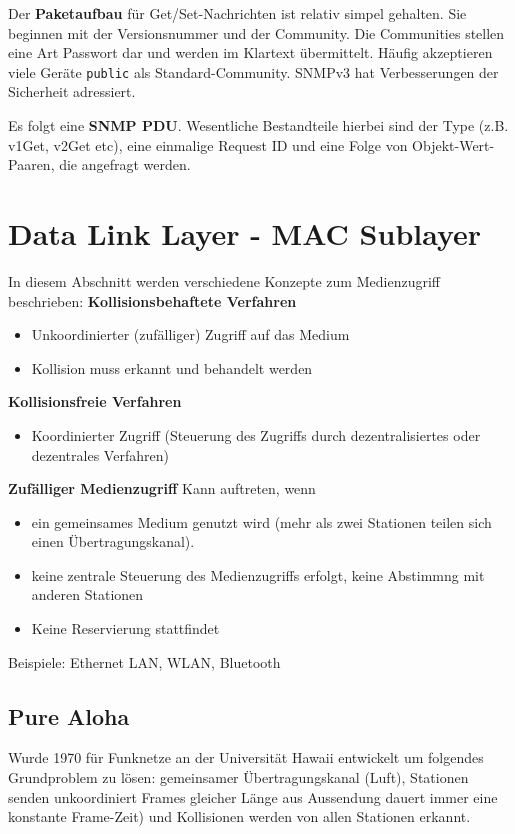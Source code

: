 \documentclass{article} %
\begin{document}
Der \textbf{Paketaufbau} für Get/Set-Nachrichten ist relativ simpel gehalten.
Sie beginnen mit der Versionsnummer und der Community.
Die Communities stellen eine Art Passwort dar und werden im Klartext übermittelt.
Häufig akzeptieren viele Geräte \texttt{public} als Standard-Community.
SNMPv3 hat Verbesserungen der Sicherheit adressiert.

Es folgt eine \textbf{SNMP PDU}.
Wesentliche Bestandteile hierbei sind der Type (z.B. v1Get, v2Get etc), eine einmalige Request ID und eine Folge von Objekt-Wert-Paaren, die angefragt werden.
\section{Data Link Layer - MAC Sublayer}
In diesem Abschnitt werden verschiedene Konzepte zum Medienzugriff beschrieben:
\textbf{Kollisionsbehaftete Verfahren}
	\begin{itemize}
	\item Unkoordinierter (zufälliger) Zugriff auf das Medium 
	\item Kollision muss erkannt und behandelt werden		
	\end{itemize} 
\textbf{Kollisionsfreie Verfahren}
	\begin{itemize}
	\item Koordinierter Zugriff (Steuerung des Zugriffs durch dezentralisiertes oder dezentrales Verfahren) 
	\end{itemize}
	
\textbf{Zufälliger Medienzugriff}
Kann auftreten, wenn 
	\begin{itemize}
	\item ein gemeinsames Medium genutzt wird (mehr als zwei Stationen teilen sich einen Übertragungskanal). 
	\item keine zentrale Steuerung des Medienzugriffs erfolgt, keine Abstimmng mit anderen Stationen 
	\item Keine Reservierung stattfindet
\end{itemize}
Beispiele: Ethernet LAN, WLAN, Bluetooth

\subsection{Pure Aloha}
Wurde 1970 für  Funknetze an der Universität Hawaii entwickelt  um folgendes Grundproblem zu lösen: gemeinsamer Übertragungskanal (Luft), Stationen senden unkoordiniert Frames gleicher Länge aus Aussendung dauert immer eine konstante Frame-Zeit) und Kollisionen werden von allen Stationen erkannt.
\end{document}
